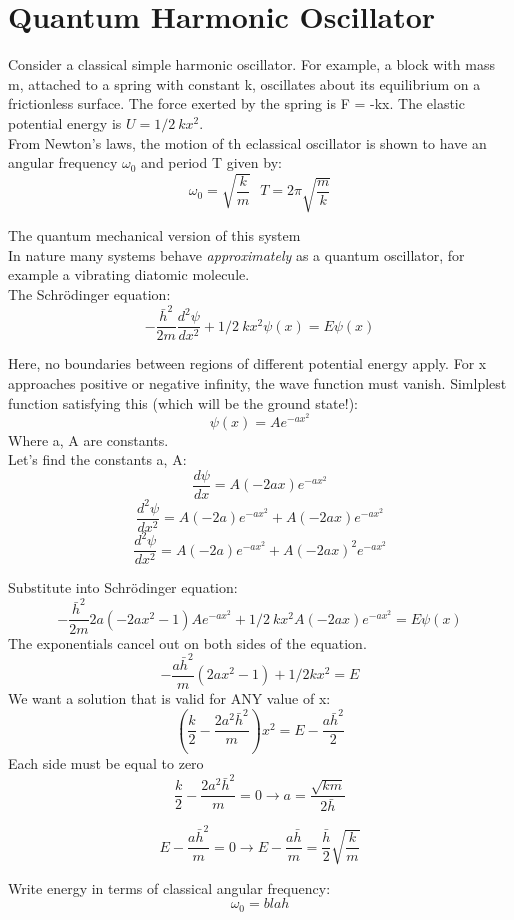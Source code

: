 \documentclass[class=article,crop=false]{standalone}
\begin{document}
\lecture
\section{Quantum Harmonic Oscillator}
Consider a classical simple harmonic oscillator. For example, a block with mass m, attached to a spring with constant k, oscillates about its equilibrium on a frictionless surface. The force exerted by the spring is F = -kx. The elastic potential energy is $U = 1/2\ kx^2$. \\

From Newton's laws, the motion of th eclassical oscillator is shown to have an angular frequency $\omega_0$ and period T given by:
$$ \omega_0 = \sqrt{\frac{k}{m}}\ \ \ T = 2\pi \sqrt{\frac{m}{k}} $$

The quantum mechanical version of this system \\

In nature many systems behave \emph{approximately} as a quantum oscillator, for example a vibrating diatomic molecule. \\

The Schrödinger equation:
$$ - \frac{\bar{h}^2}{2m} \frac{d^2\psi}{dx^2} + 1/2\ kx^2 \psi(x) = E\psi(x) $$

Here, no boundaries between regions of different potential energy apply. For x approaches positive or negative infinity, the wave function must vanish. Simlplest function satisfying this (which will be the ground state!):
$$\psi(x) = Ae^{-ax^2} $$
Where a, A are constants.\\

Let's find the constants a, A:
$$ \frac{d\psi}{dx} = A(-2ax)e^{-ax^2} $$
$$ \frac{d^2\psi}{dx^2} = A(-2a)e^{-ax^2} + A(-2ax)e^{-ax^2} $$
$$ \frac{d^2\psi}{dx^2} = A(-2a)e^{-ax^2} + A(-2ax)^2e^{-ax^2} $$

Substitute into Schrödinger equation:
$$ - \frac{\bar{h}^2}{2m} 2a(-2ax^2 - 1)Ae^{-ax^2} + 1/2\ kx^2 A(-2ax)e^{-ax^2} = E\psi(x) $$
The exponentials cancel out on both sides of the equation.
$$ - \frac{a\bar{h}^2}{m} (2ax^2 - 1) + 1/2 kx^2 = E $$
We want a solution that is valid for ANY value of x:
$$ \left( \frac{k}{2} - \frac{2a^2\bar{h}^2}{m}\right) x^2 = E - \frac{a\bar{h}^2}{2} $$
Each side must be equal to zero
$$ \frac{k}{2} - \frac{2a^2\bar{h}^2}{m} = 0 \rightarrow a = \frac{\sqrt{km}}{2\bar{h}} $$

$$ E - \frac{a\bar{h}^2}{m} = 0 \rightarrow E - \frac{a\bar{h}}{m} = \frac{\bar{h}}{2} \sqrt{\frac{k}{m}} $$

Write energy in terms of classical angular frequency:
$$ \omega_0 = blah $$
\end{document}
